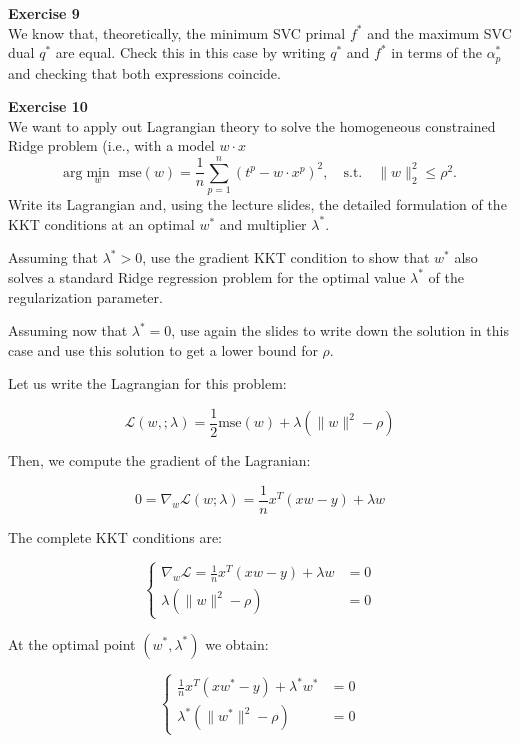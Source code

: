 \documentclass[11pt,table]{article}
\newenvironment{problem}[2][Exercise]
{ \begin{mdframed}[backgroundcolor=gray!20] \textbf{#1 #2} \\}
	{  \end{mdframed}}
\newcommand\norm[1]{\lVert#1\rVert}
\begin{document}
	\begin{problem}{9}
		We know that, theoretically, the minimum SVC primal \(f^*\) and the maximum SVC dual \(q^*\) are equal. Check this in this case by writing \(q^*\) and \(f^*\) in terms of the \(\alpha_p^*\) and checking that both expressions coincide.
	\end{problem}
	
	\begin{problem}{10}
		We want to apply out Lagrangian theory to solve the homogeneous constrained Ridge problem (i.e., with a model \(w\cdot x\)
		\[
		\text{arg}\min_{w} \text{ mse}(w) = \frac{1}{n} \sum_{p=1}^n (t^p - w \cdot x^p)^2, \quad \text{s.t.} \quad \norm{w}_2^2 \leq \rho^2.
		\]
		Write its Lagrangian and, using the lecture slides, the detailed formulation of the KKT conditions at an optimal \(w^*\) and multiplier \(\lambda^*\).
		
		Assuming that \(\lambda^* > 0\), use the gradient KKT condition to show that \(w^*\) also solves a standard Ridge regression problem for the optimal value \(\lambda^*\) of the regularization parameter.
		
		Assuming now that \(\lambda^* = 0\), use again the slides to write down the solution in this case and use this solution to get a lower bound for \(\rho\).
	\end{problem}
	
	Let us write the Lagrangian for this problem:
	
	\[
	\mathcal L(w, ; \lambda) = \frac{1}{2} \text{mse}(w) + \lambda \left(\parallel w \parallel^2 - \rho\right)
	\]
	
	Then, we compute the gradient of the Lagranian:
	
	\[
	0 = \nabla_w \mathcal L(w; \lambda) = \frac{1}{n}x^T(xw - y) + \lambda w
	\]
	
	The complete KKT conditions are:
	
	\begin{equation*}
		\begin{cases}
			\nabla_w \mathcal L = \frac{1}{n}x^T(xw - y) + \lambda w & = 0 \\
			\lambda \left(\parallel w \parallel^2 - \rho\right) & = 0
		\end{cases}
	\end{equation*}
	
	At the optimal point $(w^*, \lambda^*)$ we obtain:
	
	\begin{equation}
		\label{eq10}
		\begin{cases}
			\frac{1}{n}x^T(xw^* - y) + \lambda^* w^* & = 0 \\
			\lambda^* \left(\parallel w^* \parallel^2 - \rho\right) & = 0
		\end{cases}
	\end{equation}
	
\end{document}
